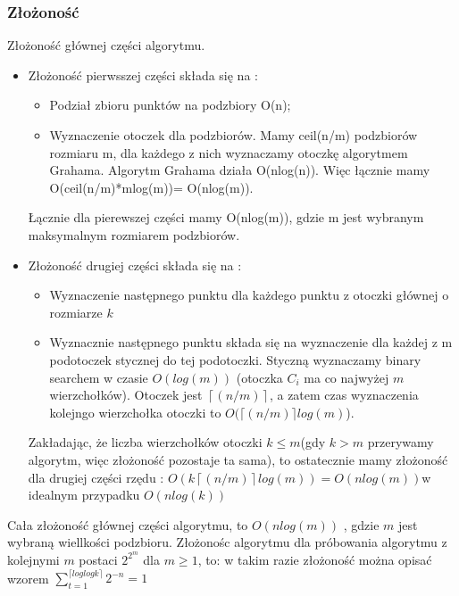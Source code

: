 \documentclass[11pt]{article}
\theoremstyle{remark} \newtheorem{definition}{def.}
\theoremstyle{definition} \newtheorem{twierdzenie}{tw.}
\begin{document}
    \subsubsection{Złożoność}
    Złożoność głównej części algorytmu.
    \begin{itemize}
        \item Złożoność pierwsszej części składa się na :
                \begin{itemize}
                    \item   Podział zbioru punktów na podzbiory O(n);
                    \item   Wyznaczenie otoczek dla podzbiorów. Mamy ceil(n/m) podzbiorów
                            rozmiaru m, dla każdego z nich wyznaczamy otoczkę algorytmem Grahama.
                            Algorytm Grahama działa O(nlog(n)). Więc łącznie mamy O(ceil(n/m)*mlog(m))=
                            O(nlog(m)).
                \end{itemize}
                Łącznie dla pierewszej części mamy O(nlog(m)), gdzie m jest wybranym maksymalnym
                 rozmiarem podzbiorów.

        \item Złożoność drugiej części składa się na :
                 \begin{itemize}
                     \item   Wyznaczenie następnego punktu dla każdego punktu z otoczki głównej o rozmiarze $k$
                     \item   Wyznacznie następnego punktu składa się na wyznaczenie dla każdej z m podotoczek
                            stycznej do tej podotoczki. Styczną wyznaczamy binary searchem w czasie $O(log(m))$
                            (otoczka $C_i$ ma co najwyżej $m$ wierzchołków). Otoczek jest $\left\lceil(n/m) \right\rceil$, a zatem czas
                            wyznaczenia kolejngo wierzchołka otoczki to $O(\lceil(n/m)\rceil log(m)$).    
                 \end{itemize}
                 Zakładając, że liczba wierzchołków otoczki $k \le m$(gdy $k > m$ przerywamy algorytm, więc złożoność pozostaje ta sama),
                  to ostatecznie mamy złożoność dla drugiej części rzędu : $O(k \left\lceil(n/m)\right\rceil log(m)) = O(nlog(m)) $w idealnym przypadku $O(nlog(k))$
    \end{itemize}

    Cała złożoność głównej części algorytmu, to $O(nlog(m))$ , gdzie $m$ jest wybraną wiellkości podzbioru.
    Złożonośc algorytmu dla próbowania algorytmu z kolejnymi $m$ postaci $2^{2^m}$ dla $m \ge 1$, to:
    w takim razie złożoność można opisać wzorem $ \sum_{t=1}^{ \lceil log log k \rceil } 2^{-n} = 1 $
\end{document}
